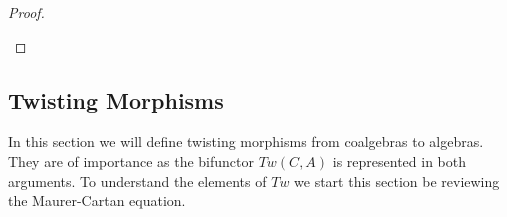 \documentclass[../thesis.tex]{subfiles}
\begin{document}
\begin{proof}
\begin{center}
                \end{center}

            \end{proof}

    \subsection{Twisting Morphisms}

            In this section we will define twisting morphisms from coalgebras to algebras. They are of importance as the bifunctor $Tw(C,A)$ is represented in both arguments. To understand the elements of $Tw$ we start this section be reviewing the Maurer-Cartan equation.
\end{document}

